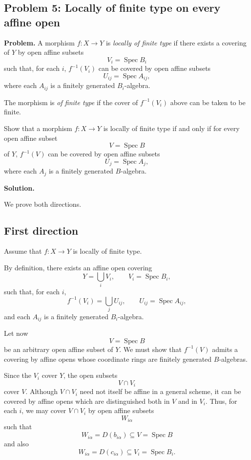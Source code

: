 
\subsection*{Problem 5: Locally of finite type on every affine open}

\textbf{Problem.}
A morphism \(f:X\to Y\) is \emph{locally of finite type} if there exists a covering of \(Y\) by open affine subsets
\[
V_i=\operatorname{Spec} B_i
\]
such that, for each \(i\), \(f^{-1}(V_i)\) can be covered by open affine subsets
\[
U_{ij}=\operatorname{Spec} A_{ij},
\]
where each \(A_{ij}\) is a finitely generated \(B_i\)-algebra.

The morphism is \emph{of finite type} if the cover of \(f^{-1}(V_i)\) above can be taken to be finite.

Show that a morphism \(f:X\to Y\) is locally of finite type if and only if for every open affine subset
\[
V=\operatorname{Spec} B
\]
of \(Y\), \(f^{-1}(V)\) can be covered by open affine subsets
\[
U_j=\operatorname{Spec} A_j,
\]
where each \(A_j\) is a finitely generated \(B\)-algebra.

\bigskip

\textbf{Solution.}

We prove both directions.

\subsection*{First direction}

Assume that \(f:X\to Y\) is locally of finite type.

By definition, there exists an affine open covering
\[
Y=\bigcup_i V_i,
\qquad
V_i=\operatorname{Spec} B_i,
\]
such that, for each \(i\),
\[
f^{-1}(V_i)=\bigcup_j U_{ij},
\qquad
U_{ij}=\operatorname{Spec} A_{ij},
\]
and each \(A_{ij}\) is a finitely generated \(B_i\)-algebra.

Let now
\[
V=\operatorname{Spec} B
\]
be an arbitrary open affine subset of \(Y\). We must show that \(f^{-1}(V)\) admits a covering by affine opens whose coordinate rings are finitely generated \(B\)-algebras.

Since the \(V_i\) cover \(Y\), the open subsets
\[
V\cap V_i
\]
cover \(V\). Although \(V\cap V_i\) need not itself be affine in a general scheme, it can be covered by affine opens which are distinguished both in \(V\) and in \(V_i\). Thus, for each \(i\), we may cover \(V\cap V_i\) by open affine subsets
\[
W_{i\alpha}
\]
such that
\[
W_{i\alpha}=D(b_{i\alpha})\subseteq V=\operatorname{Spec} B
\]
and also
\[
W_{i\alpha}=D(c_{i\alpha})\subseteq V_i=\operatorname{Spec} B_i.
\]

